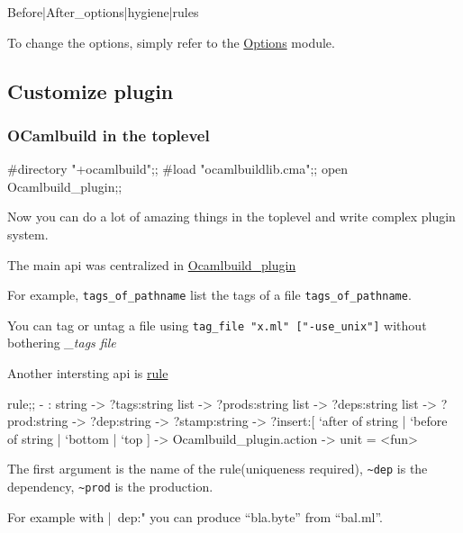 \begin{bashcode}
{Before|After}_{options|hygiene|rules}
\end{bashcode}

To change the options, simply refer to the
\href{http://www.seas.upenn.edu/~hongboz/hongbo_zhang_files/ob/Options.html}{Options}
module.



\subsection{Customize plugin}

\subsubsection{OCamlbuild in the toplevel }
\begin{ocamlcode}
#directory "+ocamlbuild";;
#load "ocamlbuildlib.cma";;
open Ocamlbuild_plugin;;
\end{ocamlcode}

Now you can do a lot of amazing things in the toplevel and write
complex plugin system.

The main api was centralized in
\href{http://www.seas.upenn.edu/~hongboz/hongbo_zhang_files/ob/Ocamlbuild_plugin.html}{Ocamlbuild\_plugin}

For example, \verb|tags_of_pathname| list the tags of a file
\verb|tags_of_pathname|.

You can tag or untag a file using \verb|tag_file "x.ml" ["-use_unix"]|
without bothering \textit{\_tags file}

Another intersting api is
\href{http://www.seas.upenn.edu/~hongboz/hongbo_zhang_files/ob/code_VALRule.rule.html}{rule}

\begin{ocamlcode}
rule;;
- : string ->
    ?tags:string list ->
    ?prods:string list ->
    ?deps:string list ->
    ?prod:string ->
    ?dep:string ->
    ?stamp:string ->
    ?insert:[ `after of string | `before of string | `bottom | `top ] ->
    Ocamlbuild_plugin.action -> unit
= <fun>
\end{ocamlcode}

The first argument is the name of the rule(uniqueness required),
\verb|~dep| is the dependency, \verb|~prod| is the production.

For example with
|~dep:"%
you can produce ``bla.byte'' from ``bal.ml''.

